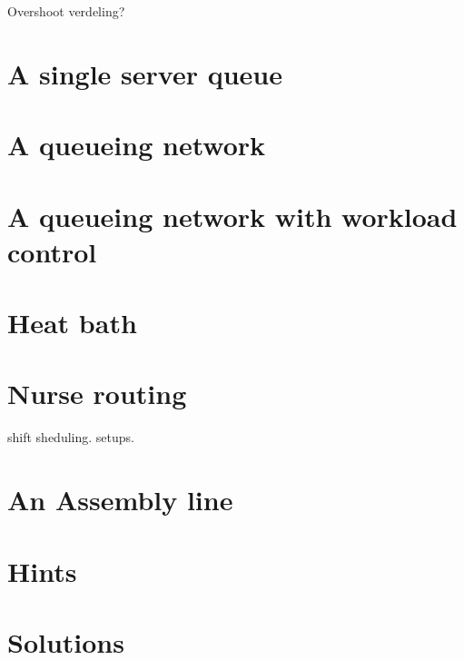 \documentclass{scrartcl}
\begin{document}






Overshoot verdeling? 

\section{A single server queue}
\label{sec:single-server-queue}

\section{A queueing network}
\label{sec:queueing-network}


\section{A queueing network with workload control}
\label{sec:queu-netw-with}



\section{Heat bath}
\label{sec:heat-bath}

\section{Nurse routing}
\label{sec:nurse-routing}

shift sheduling. setups. 


\section{An Assembly line}
\label{sec:an-assembly-line}





\clearpage
\section*{Hints}


\clearpage
\section*{Solutions}

\end{document}
